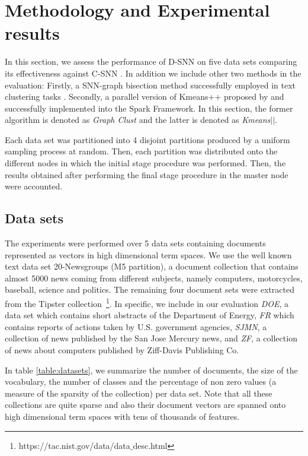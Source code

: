 \documentclass[smallextended]{svjour3}       %
\begin{document}
\section{Methodology and Experimental results}
\label{sec:exps}

In this section, we assess the performance of D-SNN on five data sets comparing its effectiveness against C-SNN \cite{ESK03}. 
In addition we include other two methods in the evaluation: Firstly, a SNN-graph bisection method successfully employed in text clustering tasks \cite{ZK02}. Secondly, a parallel version of Kmeans++ proposed by \cite{BMVKV12} and successfully implemented into the Spark Framework. In this section, the former algorithm is denoted as \textit{Graph Clust} and the latter is denoted as \textit{Kmeans$||$}.

Each data set was partitioned into 4 disjoint partitions produced by a uniform sampling process at random. 
Then, each partition was distributed onto the different nodes in which the initial stage procedure was performed. 
Then, the results obtained after performing the final stage procedure in the master node were accounted.

\subsection*{Data sets}

The experiments were performed over 5 data sets containing documents represented as vectors in high dimensional term spaces. 
We use the well known text data set 20-Newsgroups (M5 partition), a document collection that contains almost 5000 news coming from different subjects, namely computers, motorcycles, baseball, science and politics. The remaining four document sets were extracted from the Tipster collection~\footnote{https://tac.nist.gov/data/data$\_$desc.html}. In specific, we include in our evaluation \textit{DOE}, a data set which contains short abstracts of the Department of Energy, \textit{FR} which contains reports of actions taken by U.S. government agencies, \textit{SJMN}, a collection of news published by the San Jose Mercury news, and \textit{ZF}, a collection of news about computers published by Ziff-Davis Publishing Co.

In table \ref{table:datasets}, we summarize the number of documents, the size of the vocabulary, the number of classes and the percentage of non zero values (a measure of the sparsity of the collection) per data set. Note that all these collections are quite sparse and also their document vectors are spanned onto high dimensional term spaces with tens of thousands of features. 
\end{document}
